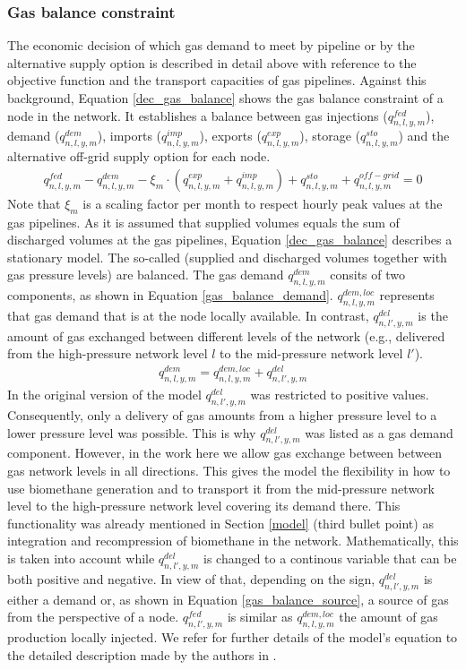 \subsubsection{Gas balance constraint}
The economic decision of which gas demand to meet by pipeline or by the alternative supply option is described in detail above with reference to the objective function and the transport capacities of gas pipelines. Against this background, Equation \ref{dec_gas_balance} shows the gas balance constraint of a node in the network. It establishes a balance between gas injections ($q^{fed}_{n,l,y,m}$), demand ($q^{dem}_{n,l,y,m}$), imports ($q^{imp}_{n,l,y,m}$), exports ($q^{exp}_{n,l,y,m}$), storage ($q^{sto}_{n,l,y,m}$) and the alternative off-grid supply option for each node.
\begin{align}\label{dec_gas_balance}
	q^{fed}_{n,l,y,m} - q^{dem}_{n,l,y,m} - \xi_m \cdot \left(q^{exp}_{n,l,y,m} + q^{imp}_{n,l,y,m}\right) + q^{sto}_{n,l,y,m}+q^{off-grid}_{n,l,y,m}=0
\end{align}
Note that $\xi_m$ is a scaling factor per month to respect hourly peak values at the gas pipelines. As it is assumed that supplied volumes equals the sum of discharged volumes at the gas pipelines, Equation \ref{dec_gas_balance} describes a stationary model. The so-called (supplied and discharged volumes together with gas pressure levels) are balanced. The gas demand $q^{dem}_{n,l,y,m}$ consits of two components, as shown in Equation \ref{gas_balance_demand}. $q^{dem,loc}_{n,l,y,m}$ represents that gas demand that is at the node locally available. In contrast, $q^{del}_{n,l',y,m}$ is the amount of gas exchanged between different levels of the network (e.g., delivered from the high-pressure network level $l$ to the mid-pressure network level $l'$). 
\begin{align}\label{gas_balance_demand}
	q^{dem}_{n,l,y,m} = q^{dem,loc}_{n,l,y,m} + q^{del}_{n,l',y,m}
\end{align}
In the original version of the model $q^{del}_{n,l',y,m}$ was restricted to positive values. Consequently, only a delivery of gas amounts from a higher pressure level to a lower pressure level was possible. This is why $q^{del}_{n,l',y,m}$ was listed as a gas demand component. However, in the work here we allow gas exchange between between gas network levels in all directions. This gives the model the flexibility in how to use biomethane generation and to transport it from the mid-pressure network level to the high-pressure network level covering its demand there. This functionality was already mentioned in Section \ref{model} (third bullet point) as integration and recompression of biomethane in the network. Mathematically, this is taken into account while $q^{del}_{n,l',y,m}$ is changed to a continous variable that can be both positive and negative. In view of that, depending on the sign, $q^{del}_{n,l',y,m}$ is either a demand or, as shown in Equation \ref{gas_balance_source}, a source of gas from the perspective of a node. $q^{fed}_{n,l',y,m}$ is similar as $q^{dem,loc}_{n,l,y,m}$ the amount of gas production locally injected. We refer for further details of the model's equation to the detailed description made by the authors in \cite{zwickl2023design}.
